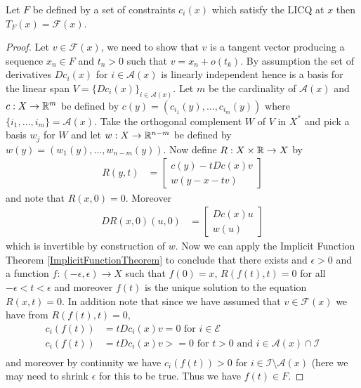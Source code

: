 \begin{prop}Let $F$ be defined by a set of constraints $c_i(x)$ which
  satisfy the LICQ at $x$ then $T_F(x) = \mathcal{F}(x)$.
\end{prop}
\begin{proof}
Let $v \in \mathcal{F}(x)$, we need to show that $v$ is a tangent
vector producing a sequence $x_n \in F$ and $t_n > 0$ such that $v = x_n + o(t_k)$. 
By assumption the set of derivatives $Dc_i(x)$ for $i \in
\mathcal{A}(x)$ is linearly independent hence is a basis for the linear 
span $V = \lbrace Dc_i(x) \rbrace_{i \in \mathcal{A}(x)}$.  Let $m$ be the cardinality of $\mathcal{A}(x)$ and $c : X \to \mathbb{R}^m$ 
be defined by $c(y) = (c_{i_1}(y), \dotsc, c_{i_m}(y))$ where $\lbrace i_1, \dotsc, i_m \rbrace = \mathcal{A}(x)$.
Take the orthogonal complement $W$ of $V$ 
in $X^*$ and pick a basis $w_j$ for $W$ and let $w : X \to \mathbb{R}^{n-m}$ be defined by $w(y) = (w_1(y), \dotsc, w_{n-m}(y))$.  Now define $R : X \times \mathbb{R} \to X$ by
\begin{align*}
R(y,t) &= \begin{bmatrix}
c(y) - t Dc(x) v \\
w(y - x - tv)
\end{bmatrix}
\end{align*}
and note that $R(x,0) = 0$.  Moreover 
\begin{align*}
DR(x,0)(u, 0) &= \begin{bmatrix}
Dc(x) u \\
w(u)
\end{bmatrix}
\end{align*}
which is invertible by construction of $w$.  Now we can apply the Implicit Function Theorem \ref{ImplicitFunctionTheorem} to 
conclude that there exists and $\epsilon > 0$ and a function $f : (-\epsilon, \epsilon) \to X$ such that $f(0) = x$, $R(f(t), t) = 0$ 
for all $-\epsilon < t < \epsilon$ and moreover $f(t)$ is the unique solution to the equation $R(x,t) = 0$.  In addition note that
since we have assumed that $v \in \mathcal{F}(x)$ we have from $R(f(t), t) = 0$,
\begin{align*}
c_i(f(t)) &= t Dc_i(x) v = 0 \text{ for $i \in \mathcal{E}$} \\
c_i(f(t)) &= t Dc_i(x) v >= 0 \text{ for $t > 0$ and $i \in \mathcal{A}(x)\cap \mathcal{I}$} \\
\end{align*}
and moreover by continuity we have $c_i(f(t)) > 0$ for $i \in \mathcal{I} \setminus \mathcal{A}(x)$ (here we may need to shrink $\epsilon$ for this to be true.  Thus we have $f(t) \in F$.  




\end{proof}
